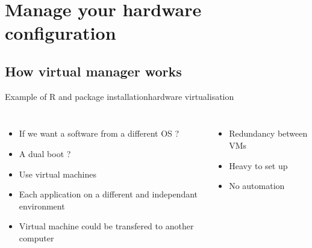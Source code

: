 \section{Manage your hardware configuration}
\subsection{How virtual manager works}

\begin{frame}{Example of R and package installation}{hardware virtualisation}
\begin{columns}
\begin{itemize}[<+->]
	\item If we want a software from a different OS ?
	\item A dual boot ?
	\item Use virtual machines
	\item Each application on a different and independant environment
	\item Virtual machine could be transfered to another computer
\end{itemize}
\begin{itemize}[<+->]
	\item Redundancy between VMs
	\item Heavy to set up
	\item No automation
\end{itemize}
\end{columns}
\end{frame}
\begin{frame}
\end{frame}

